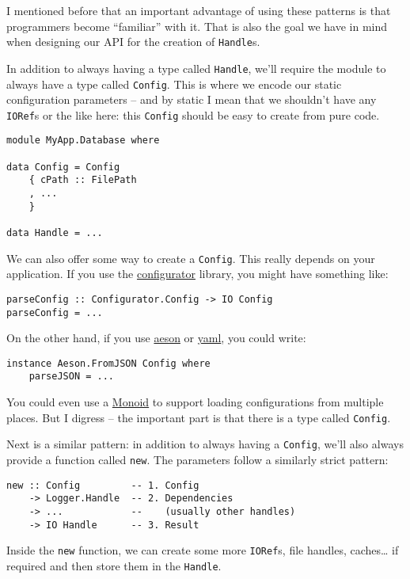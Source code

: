I mentioned before that an important advantage of using these patterns
is that programmers become ``familiar'' with it. That is also the goal
we have in mind when designing our API for the creation of
\texttt{Handle}s.

In addition to always having a type called \texttt{Handle}, we'll
require the module to always have a type called \texttt{Config}. This is
where we encode our static configuration parameters -- and by static I
mean that we shouldn't have any \texttt{IORef}s or the like here: this
\texttt{Config} should be easy to create from pure code.

\begin{verbatim}
module MyApp.Database where

data Config = Config
    { cPath :: FilePath
    , ...
    }

data Handle = ...
\end{verbatim}
We can also offer some way to create a \texttt{Config}. This really
depends on your application. If you use the
\href{https://hackage.haskell.org/package/configurator}{configurator}
library, you might have something like:

\begin{verbatim}
parseConfig :: Configurator.Config -> IO Config
parseConfig = ...
\end{verbatim}
On the other hand, if you use
\href{https://hackage.haskell.org/package/aeson}{aeson} or
\href{https://hackage.haskell.org/package/yaml}{yaml}, you could write:

\begin{verbatim}
instance Aeson.FromJSON Config where
    parseJSON = ...
\end{verbatim}
You could even use a
\href{https://medium.com/@jonathangfischoff/the-partial-options-monoid-pattern-31914a71fc67}{Monoid}
to support loading configurations from multiple places. But I digress --
the important part is that there is a type called \texttt{Config}.

Next is a similar pattern: in addition to always having a
\texttt{Config}, we'll also always provide a function called
\texttt{new}. The parameters follow a similarly strict pattern:

\begin{verbatim}
new :: Config         -- 1. Config
    -> Logger.Handle  -- 2. Dependencies
    -> ...            --    (usually other handles)
    -> IO Handle      -- 3. Result
\end{verbatim}
Inside the \texttt{new} function, we can create some more
\texttt{IORef}s, file handles, caches\ldots{} if required and then store
them in the \texttt{Handle}.

